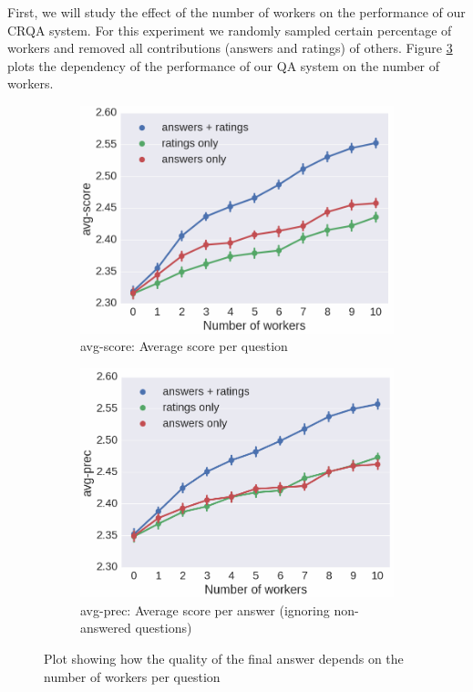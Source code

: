 First, we will study the effect of the number of workers on the performance of our CRQA system.
For this experiment we randomly sampled certain percentage of workers and removed all contributions (answers and ratings) of others.
Figure \ref{fig:nworkers_vs_quality} plots the dependency of the performance of our QA system on the number of workers.

\begin{figure}[h!t]
  \begin{subfigure}[t]{0.5\textwidth}
	\centering
	\includegraphics[width=\textwidth]{img/nworkers_vs_accuracy}
	\caption{avg-score: Average score per question}
	\label{fig:nworkers_vs_accuracy}
  \end{subfigure}
  \begin{subfigure}[t]{0.5\textwidth}
	\centering
	\includegraphics[width=\textwidth]{img/nworkers_vs_precision}
	\caption{avg-prec: Average score per answer (ignoring non-answered questions)}
	\label{fig:nworkers_vs_precision}
  \end{subfigure}
	\caption{Plot showing how the quality of the final answer depends on the number of workers per question}
	\label{fig:nworkers_vs_quality}
\end{figure}

